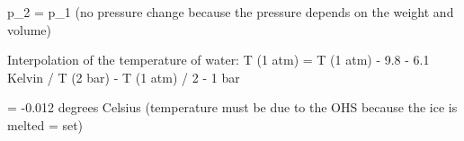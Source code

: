 p_2 = p_1 (no pressure change because the pressure depends on the weight and volume)  

Interpolation of the temperature of water:  
T (1 atm) = T (1 atm) - 9.8 - 6.1 Kelvin / T (2 bar) - T (1 atm) / 2 - 1 bar  

= -0.012 degrees Celsius (temperature must be due to the OHS because the ice is melted = set)